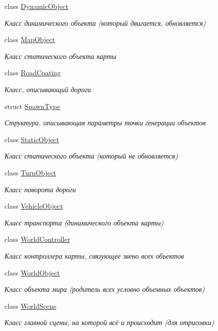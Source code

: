 \begin{DoxyCompactItemize}
class \hyperlink{classrtm_1_1_dynamic_object}{Dynamic\+Object}
\begin{DoxyCompactList}\small\item\em Класс динамического объекта (который двигается, обновляется) \end{DoxyCompactList}\item 
class \hyperlink{classrtm_1_1_map_object}{Map\+Object}
\begin{DoxyCompactList}\small\item\em Класс статического объекта карты \end{DoxyCompactList}\item 
class \hyperlink{classrtm_1_1_road_coating}{Road\+Coating}
\begin{DoxyCompactList}\small\item\em Класс, описывающий дороги \end{DoxyCompactList}\item 
struct \hyperlink{structrtm_1_1_spawn_type}{Spawn\+Type}
\begin{DoxyCompactList}\small\item\em Структура, описывающая параметры точки генерации объектов \end{DoxyCompactList}\item 
class \hyperlink{classrtm_1_1_static_object}{Static\+Object}
\begin{DoxyCompactList}\small\item\em Класс статического объекта (который не обновляется) \end{DoxyCompactList}\item 
class \hyperlink{classrtm_1_1_turn_object}{Turn\+Object}
\begin{DoxyCompactList}\small\item\em Класс поворота дороги \end{DoxyCompactList}\item 
class \hyperlink{classrtm_1_1_vehicle_object}{Vehicle\+Object}
\begin{DoxyCompactList}\small\item\em Класс транспорта (динамического объекта карты) \end{DoxyCompactList}\item 
class \hyperlink{classrtm_1_1_world_controller}{World\+Controller}
\begin{DoxyCompactList}\small\item\em Класс контроллера карты, связующее звено всех объектов \end{DoxyCompactList}\item 
class \hyperlink{classrtm_1_1_world_object}{World\+Object}
\begin{DoxyCompactList}\small\item\em Класс объекта мира (родитель всех условно объемных объектов) \end{DoxyCompactList}\item 
class \hyperlink{classrtm_1_1_world_scene}{World\+Scene}
\begin{DoxyCompactList}\small\item\em Класс главной сцены, на которой всё и происходит (для отрисовки) \end{DoxyCompactList}\end{DoxyCompactItemize}
